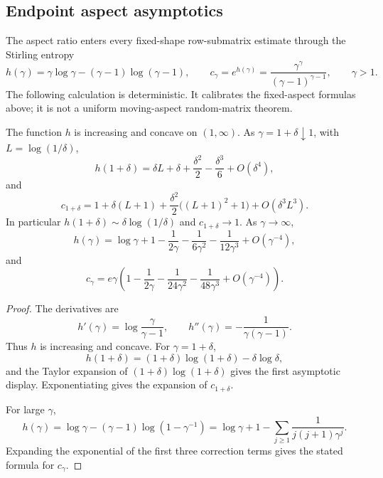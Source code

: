 \subsection{Endpoint aspect asymptotics}\label{sec:aspect-asymptotics}

The aspect ratio enters every fixed-shape row-submatrix estimate through the
Stirling entropy
\[
  h(\gamma)=\gamma\log\gamma-(\gamma-1)\log(\gamma-1),
  \qquad
  c_\gamma=e^{h(\gamma)}
  =\frac{\gamma^\gamma}{(\gamma-1)^{\gamma-1}},
  \qquad \gamma>1 .
\]
The following calculation is deterministic.  It calibrates the fixed-aspect
formulas above; it is not a uniform moving-aspect random-matrix theorem.

\begin{proposition}\label{prop:h-asymptotics}
The function \(h\) is increasing and concave on \((1,\infty)\).  As
\(\gamma=1+\delta\downarrow1\), with \(L=\log(1/\delta)\),
\[
  h(1+\delta)
  =\delta L+\delta+\frac{\delta^2}{2}-\frac{\delta^3}{6}
    +O(\delta^4),
\]
and
\[
  c_{1+\delta}
  =1+\delta(L+1)
   +\frac{\delta^2}{2}\bigl((L+1)^2+1\bigr)
   +O(\delta^3L^3).
\]
In particular \(h(1+\delta)\sim\delta\log(1/\delta)\) and
\(c_{1+\delta}\to1\).  As \(\gamma\to\infty\),
\[
  h(\gamma)
  =\log\gamma+1-\frac{1}{2\gamma}
   -\frac{1}{6\gamma^2}
   -\frac{1}{12\gamma^3}
   +O(\gamma^{-4}),
\]
and
\[
  c_\gamma
  =e\gamma\left(
    1-\frac{1}{2\gamma}
     -\frac{1}{24\gamma^2}
     -\frac{1}{48\gamma^3}
     +O(\gamma^{-4})
  \right).
\]
\end{proposition}

\begin{proof}
The derivatives are
\[
  h'(\gamma)=\log\frac{\gamma}{\gamma-1},
  \qquad
  h''(\gamma)=-\frac{1}{\gamma(\gamma-1)}.
\]
Thus \(h\) is increasing and concave.  For \(\gamma=1+\delta\),
\[
  h(1+\delta)=(1+\delta)\log(1+\delta)-\delta\log\delta,
\]
and the Taylor expansion of \((1+\delta)\log(1+\delta)\) gives the first
asymptotic display.  Exponentiating gives the expansion of \(c_{1+\delta}\).

For large \(\gamma\),
\[
  h(\gamma)=\log\gamma-(\gamma-1)\log(1-\gamma^{-1})
  =\log\gamma+1-\sum_{j\ge1}\frac{1}{j(j+1)\gamma^j}.
\]
Expanding the exponential of the first three correction terms gives the stated
formula for \(c_\gamma\).
\end{proof}

